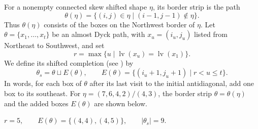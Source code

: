 \documentclass[12pt]{amsart}
\newcommand{\defi}[1]{{\upshape\sffamily #1}}
\theoremstyle{definition}
\numberwithin{equation}{section}
\begin{document}
\medskip

For a nonempty connected skew shifted shape $\eta$, its
\defi{border strip} is the path
\begin{equation}\label{eq:sh-inner-boundary}
 \theta(\eta)=\{(i,j)\in\eta\mid(i-1,j-1)\notin\eta\}.
\end{equation}
Thus $\theta(\eta)$ consists of the boxes on the Northwest border
of $\eta$. Let $\theta=\{x_1,\ldots,x_t\}$ be an almost Dyck path,
with $x_u=(i_u,j_u)$ listed from Northeast to Southwest, and set
\[
 r=\max\{u\mid\operatorname{lv}(x_u)=\operatorname{lv}(x_1)\}.
\]
We define its \defi{shifted completion} (see \cite{brenti}) by
\begin{equation}\label{eq:sh-completion}
 \theta_s=\theta\sqcup E(\theta),\qquad
 E(\theta)=\{(i_u+1,j_u+1)\mid r<u\leq t\}.
\end{equation}
In words, for each box of $\theta$ after its last visit to the
initial antidiagonal, add one box to its southeast. For $\eta=(7,6,4,2)/(4,3)$, the border strip
$\theta=\theta(\eta)$ and the added boxes $E(\theta)$ are shown below.\\

\begin{center}
\par\smallskip
$r=5,\qquad E(\theta)=\{(4,4),(4,5)\},\qquad |\theta_s|=9.$
\end{center}

\medskip
\end{document}
